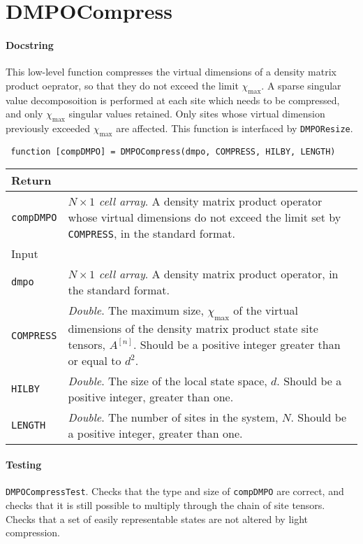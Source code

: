  \section{DMPOCompress}
 \paragraph{Docstring} This low-level function compresses the virtual dimensions of a density matrix product oeprator, so that they do not exceed the limit \(\chi_{\mathrm{max}}\). A sparse singular value decomposoition is performed at each site which needs to be compressed, and only \(\chi_{\mathrm{max}}\) singular values retained. Only sites whose virtual dimension previously exceeded \(\chi_{\mathrm{max}}\) are affected. This function is interfaced by \lstinline$DMPOResize$.
 \begin{lstlisting}
 function [compDMPO] = DMPOCompress(dmpo, COMPRESS, HILBY, LENGTH) \end{lstlisting}
 \begin{longtabu}{X[1,l]X[4,l]}
 \hline
 Return & \\ \hline
 \lstinline$compDMPO$ & \emph{\(N \times 1\) cell array}. A density matrix product operator whose virtual dimensions do not exceed the limit set by \lstinline$COMPRESS$, in the standard format. \\ \hline
 Input & \\ \hline
 \lstinline$dmpo$ & \emph{\(N \times 1\) cell array}. A density matrix product operator, in the standard format. \\
 \lstinline$COMPRESS$ & \emph{Double}. The maximum size, \(\chi_{\mathrm{max}}\) of the virtual dimensions of the density matrix product state site tensors, \(A^{[n]}\). Should be a positive integer greater than or equal to \(d^{2}\). \\
 \lstinline$HILBY$ & \emph{Double}. The size of the local state space, \(d\). Should be a positive integer, greater than one. \\
 \lstinline$LENGTH$ & \emph{Double}. The number of sites in the system, \(N\). Should be a positive integer, greater than one. \\
 \hline
 \end{longtabu}
 \paragraph{Testing} \lstinline$DMPOCompressTest$. Checks that the type and size of \lstinline$compDMPO$ are correct, and checks that it is still possible to multiply through the chain of site tensors. Checks that a set of easily representable states are not altered by light compression.

